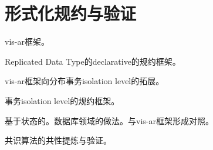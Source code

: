\chapter{形式化规约与验证}

\begin{theorem}
    
    vis-ar框架。
    
    Replicated Data Type的declarative的规约框架。
    
\end{theorem}

\begin{theorem}
    
    vis-ar框架向分布事务isolation level的拓展。
    
\end{theorem}


\begin{theorem}
    
    事务isolation level的规约框架。
    
    基于状态的。数据库领域的做法。与vis-ar框架形成对照。
    
\end{theorem}




\begin{theorem}
    
    共识算法的共性提炼与验证。
    
\end{theorem}
